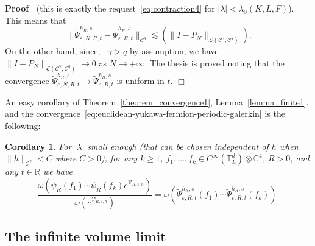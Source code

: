 \documentclass{article}
\newenvironment{proof}{\noindent\textbf{Proof\ }}{\hspace*{\fill}$\Box$\medskip}
\newtheorem{corollary}[theorem]{Corollary}
\begin{document}
\begin{proof}
  (this is exactly the request~{\eqref{eq:contraction4}} for $| \lambda | <
  \lambda_0 (K, L, F)$). This means that
  \[ \| \tilde{\Psi}_{\varepsilon, N, R, t}^{h_R, s} -
     \tilde{\Psi}_{\varepsilon, R, t}^{h_R, s} \|_{\mathcal{C}^q} \lesssim (\|
     I - P_N \|_{\mathcal{L} (\mathcal{C}^{\gamma}, \mathcal{C}^q)}) . \]
  On the other hand, since, \ $\gamma > q$ by assumption, we have $\| I - P_N
  \|_{\mathcal{L} (\mathcal{C}^{\gamma}, \mathcal{C}^q)} \rightarrow 0$ as $N
  \rightarrow + \infty$. The thesis is proved noting that the convergence
  $\tilde{\Psi}_{\varepsilon, N, R, t}^{h_R, s} \rightarrow
  \tilde{\Psi}_{\varepsilon, R, t}^{h_R, s}$ is uniform in $t$.
\end{proof}

An easy corollary of Theorem~\ref{theorem_convergence1},
Lemma~\ref{lemma_finite1}, and the
convergence~{\eqref{eq:euclidean-yukawa-fermion-periodic-galerkin}} is the
following:

\begin{corollary}
  \label{corollary_formula}For $| \lambda |$ small enough (that can be chosen
  independent of $h$ when $\| h \|_{\mathcal{C}^{\gamma}} < C$ where $C > 0$),
  for any $k \geqslant 1$, $f_1, \ldots, f_k \in C^{\infty} (\mathbb{T}^d_L)
  \otimes \mathbb{C}^4$, $R > 0$, and any $t \in \mathbb{R}$ we have
  \[ \frac{\omega (\tilde{\psi}_R (f_1) \cdots \tilde{\psi}_R (f_k)
     e^{\mathcal{V}_{R, \varepsilon, h}})}{\omega (e^{\mathcal{V}_{R,
     \varepsilon, h}})} = \omega (\tilde{\Psi}_{\varepsilon, R, t}^{h_R, s}
     (f_1) \cdots \tilde{\Psi}_{\varepsilon, R, t}^{h_R, s} (f_k)) . \]
\end{corollary}

\subsection{The infinite volume limit}\label{eq:yukawa-infinite-vol}
\end{document}

